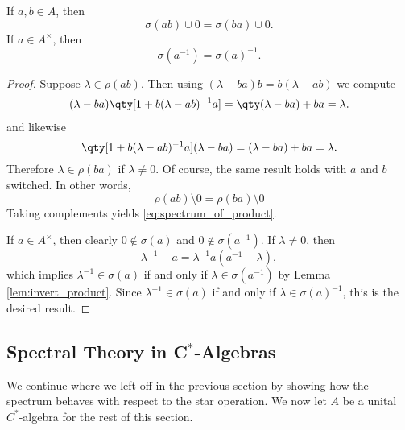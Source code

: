 \begin{theorem}
If $a, b \in A$, then
\begin{equation}\label{eq:spectrum_of_product}
\sigma(ab) \cup \qty{0} = \sigma(ba) \cup \qty{0}.
\end{equation}
If $a \in A^\times$, then
\begin{equation}
\sigma(a^{-1}) = \sigma(a)^{-1}.
\end{equation}
\end{theorem}

\begin{proof}
Suppose $\lambda \in \rho(ab)$. Then using $(\lambda - ba)b = b(\lambda - ab)$ we compute
\begin{equation}
\begin{aligned}
(\lambda - ba)\qty[1 + b(\lambda - ab)^{-1}a] = \qty(\lambda - ba) + ba = \lambda.
\end{aligned}
\end{equation}
and likewise
\begin{equation}
\qty[1 + b(\lambda - ab)^{-1}a] (\lambda - ba) = (\lambda - ba)  + ba = \lambda.
\end{equation}
Therefore $\lambda \in \rho(ba)$ if $\lambda \neq 0$. Of course, the same result holds with $a$ and $b$ switched. In other words,
\begin{equation}
\rho(ab) \setminus \qty{0} = \rho(ba) \setminus \qty{0}
\end{equation}
Taking complements yields \eqref{eq:spectrum_of_product}.

If $a \in A^\times$, then clearly $0 \notin \sigma(a)$ and $0 \notin \sigma(a^{-1})$. If $\lambda \neq 0$, then
\begin{equation}
\lambda^{-1} - a = \lambda^{-1} a(a^{-1} - \lambda),
\end{equation}
which implies $\lambda^{-1} \in \sigma(a)$ if and only if $\lambda \in \sigma(a^{-1})$ by Lemma \ref{lem:invert_product}. Since $\lambda^{-1} \in \sigma(a)$ if and only if $\lambda \in \sigma(a)^{-1}$, this is the desired result.
\end{proof}


\subsection[Spectral Theory in C$^*$-Algebras]{Spectral Theory in C$^*$-Algebras}

We continue where we left off in the previous section by showing how the spectrum behaves with respect to the star operation. We now let $A$ be a unital $C^*$-algebra for the rest of this section.

